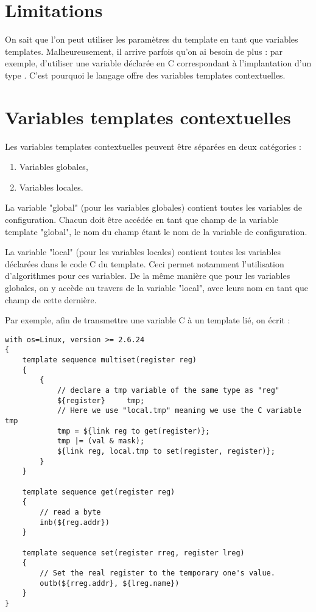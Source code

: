 \documentclass[french]{rtxreport}
\begin{document}
\section{Limitations}

On sait que l'on peut utiliser les paramètres du template en tant que variables
templates. Malheureusement, il arrive parfois qu'on ai besoin de plus : par
exemple, d'utiliser une variable déclarée en C correspondant à l'implantation 
d'un type \rtx. C'est pourquoi le langage offre des variables templates
contextuelles.


\section{Variables templates contextuelles}

Les variables templates contextuelles peuvent être séparées en deux catégories :
\begin{enumerate}
    \item Variables globales,
    \item Variables locales.
\end{enumerate}

La variable "global" (pour les variables globales) contient toutes les variables
de configuration. Chacun doit être accédée en tant que champ de la variable 
template "global", le nom du champ étant le nom de la variable de configuration.

La variable "local" (pour les variables locales) contient toutes les variables
déclarées dans le code C du template. Ceci permet notamment l'utilisation
d'algorithmes \rtx pour ces variables. De la même manière que pour les
variables globales, on y accède au travers de la variable "local", avec leurs
nom en tant que champ de cette dernière.

Par exemple, afin de transmettre une variable C à un template lié, on écrit :
\begin{lstlisting}
with os=Linux, version >= 2.6.24
{
    template sequence multiset(register reg)
    {
        {
            // declare a tmp variable of the same type as "reg"
            ${register}     tmp;
            // Here we use "local.tmp" meaning we use the C variable tmp
            tmp = ${link reg to get(register)};
            tmp |= (val & mask);
            ${link reg, local.tmp to set(register, register)};
        }
    }

    template sequence get(register reg)
    {
        // read a byte
        inb(${reg.addr})
    }

    template sequence set(register rreg, register lreg)
    {
        // Set the real register to the temporary one's value.
        outb(${rreg.addr}, ${lreg.name})
    }
}
\end{lstlisting}
\end{document}
